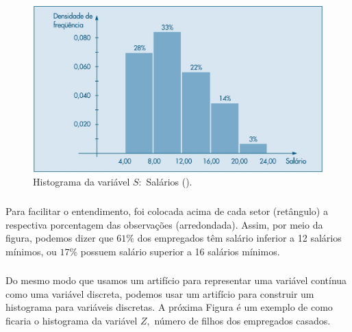 \documentclass[14pt,aspectratio=1610]{beamer}
\begin{document}
\begin{frame}{}
\frametitle{}
\begin{block}{}
\justifying
\begin{figure}[H]
    \centering
    \includegraphics[scale=0.5]{Fig5}
    \caption{Histograma da variável $S:$ Salários (\cite{Morettin09}).}
    \label{Fig5_ex}
  \end{figure}
\end{block}
\end{frame}

\begin{frame}{}
\frametitle{}
\begin{block}{}
\justifying
Para facilitar o entendimento, foi colocada acima de cada setor (retângulo) a respectiva
porcentagem das observações (arredondada). Assim, por meio da figura, podemos
dizer que $61\%$ dos empregados têm salário inferior a 12 salários mínimos, ou
$17\%$ possuem salário superior a 16 salários mínimos.
\end{block}
\end{frame}

\begin{frame}{}
\frametitle{}
\begin{block}{}
\justifying
Do mesmo modo que usamos um artifício para representar uma variável contínua
como uma variável discreta, podemos usar um artifício para construir um histograma
para variáveis discretas. A próxima Figura é um exemplo de como ficaria o histograma da
variável $Z,$ número de filhos dos empregados casados.
\end{block}
\end{frame}
\end{document}
